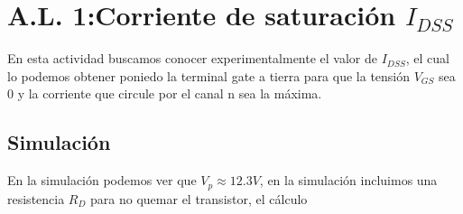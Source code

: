 \section{A.L. 1:Corriente de saturación $I_{DSS}$}

	\sangria{}En esta actividad buscamos conocer experimentalmente el valor de $I_{DSS}$, el cual lo podemos obtener poniedo la terminal gate a tierra para que la tensión $V_{GS}$ sea 0 y la corriente que circule por el canal n sea la máxima.


	\subsection{Simulación}

	\sangria{}En la simulación podemos ver que $V_p \approx 12.3V$, en la simulación incluimos una resistencia $R_D$ para no quemar el transistor, el cálculo
